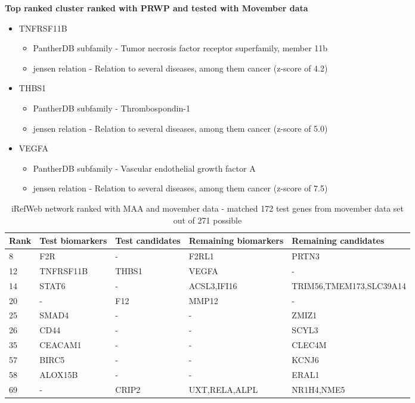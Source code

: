 \textbf{Top ranked cluster ranked with PRWP and tested with Movember data}

\begin{itemize}
    \item TNFRSF11B
        \begin{itemize}
            \item PantherDB subfamily - Tumor necrosis factor receptor
                superfamily, member 11b
            \item \gls{jensen} relation - Relation to several diseases, among
                them cancer (z-score of 4.2)
        \end{itemize}
    \item THBS1
        \begin{itemize}
            \item PantherDB subfamily - Thrombospondin-1
            \item \gls{jensen} relation - Relation to several diseases, among
                them cancer (z-score of 5.0)
        \end{itemize}
    \item VEGFA
        \begin{itemize}
            \item PantherDB subfamily - Vascular endothelial growth factor A
            \item \gls{jensen} relation - Relation to several diseases, among
                them cancer (z-score of 7.5)
        \end{itemize}
\end{itemize}

\begin{sidewaystable}
    \begin{tabular}{|l|l|l|l|l|}
        \hline
        \textbf{Rank}
        & \textbf{Test biomarkers}
        & \textbf{Test candidates}
        & \textbf{Remaining biomarkers}
        & \textbf{Remaining candidates} \\
        \hline
        8	& F2R	& -	& F2RL1	& PRTN3 \\
        \hline
        12	& TNFRSF11B	& THBS1	& VEGFA	& - \\
        \hline
        14	& STAT6	& -	& ACSL3,IFI16	& TRIM56,TMEM173,SLC39A14 \\
        \hline
        20	& -	& F12	& MMP12	& - \\
        \hline
        25	& SMAD4	& -	& -	& ZMIZ1 \\
        \hline
        26	& CD44	& -	& -	& SCYL3 \\
        \hline
        35	& CEACAM1	& -	& -	& CLEC4M \\
        \hline
        57	& BIRC5	& -	& -	& KCNJ6 \\
        \hline
        58	& ALOX15B	& -	& -	& ERAL1 \\
        \hline
        69	& -	& CRIP2	& UXT,RELA,ALPL	& NR1H4,NME5 \\
        \hline
    \end{tabular}
    \caption{iRefWeb network ranked with MAA and movember data - matched 172
    test genes from movember data set out of 271 possible}
    \label{tab:maa-movember}
\end{sidewaystable}

